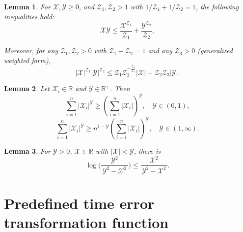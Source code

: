 \documentclass[pdflatex,sn-mathphys-num]{sn-jnl}%
\theoremstyle{thmstyleone}%
\newtheorem{lemma}{Lemma}
\theoremstyle{thmstyletwo}%
\theoremstyle{thmstylethree}%
\begin{document}
\begin{lemma}	\label{lemma:2} \cite{TeeEtAl_2009_Barrierlyapunova} For $\mathcal{X}, \mathcal{Y}  \geq 0$, and $ \mathcal{Z}_1 ,  \mathcal{Z}_2> 1$ with ${1}/{ \mathcal{Z}_1} + {1}/{ \mathcal{Z}_2} = 1$, the following inequalities hold:
	\begin{equation}\label{eq:9}
		\mathcal{X} \mathcal{Y}  \leq \frac{\mathcal{X}^{ \mathcal{Z}_1}}{ \mathcal{Z}_1} + \frac{\mathcal{Y} ^{ \mathcal{Z}_2}}{ \mathcal{Z}_2},
	\end{equation}
	 
	Moreover, for any $\mathcal{Z}_{1},\mathcal{Z}_{2}>0$ with $\mathcal{Z}_{1}+\mathcal{Z}_{2}=1$ and any $\mathcal{Z}_{3}>0$ (generalized weighted form),
	\begin{equation}\label{eq:10}
		|\mathcal{X}|^{ \mathcal{Z}_{1}}|\mathcal{Y} |^{ \mathcal{Z}_{2}}\leq  \mathcal{Z}_{1} \mathcal{Z}_{3}^{-\frac{ \mathcal{Z}_{2}}{ \mathcal{Z}_{1}}}|\mathcal{X}|+ \mathcal{Z}_{2}  \mathcal{Z}_{3}|\mathcal{Y} |.
	\end{equation} 
\end{lemma}  

\begin{lemma} \label{lemma:3}\cite{HardyLittlewoodPolya_1952_Inequalities} Let $\mathcal{X}_i\in\mathbb{R}$ and $\mathcal{Y}\in\mathbb{R}^+$. Then
	\begin{equation}\label{eq:11}
		\sum_{i=1}^{n}|\mathcal{X}_i|^{\mathcal{Y} } \geq \left(\sum_{i=1}^{n}|\mathcal{X}_i|\right)^{\mathcal{Y} }, \quad \mathcal{Y}  \in (0,1) ,
	\end{equation}
	\begin{equation}\label{eq:12}
		\sum_{i=1}^{n}|\mathcal{X}_i|^{\mathcal{Y} } \geq n^{1-\mathcal{Y} }\left(\sum_{i=1}^{n}|\mathcal{X}_i|\right)^{\mathcal{Y} }, \quad \mathcal{Y}  \in (1,\infty) .
	\end{equation}
\end{lemma}
\begin{lemma}	\label{lemma:4}\cite{TeeEtAl_2009_Barrierlyapunov}
	For \(\mathcal{Y} >0\), \(\mathcal{X}\in \mathbb R\) with \(\lvert \mathcal{X}\rvert < \mathcal{Y} \), there is
\begin{equation}\label{eq:13}
		\log\!\biggl(\frac{\mathcal{Y} ^2}{\,\mathcal{Y} ^2 - \mathcal{X}^2\,}\biggr)
		\le
		\frac{\mathcal{X}^2}{\,\mathcal{Y} ^2 - \mathcal{X}^2\,}.
	\end{equation}
\end{lemma}



\section{Predefined time error transformation function}
\end{document}

